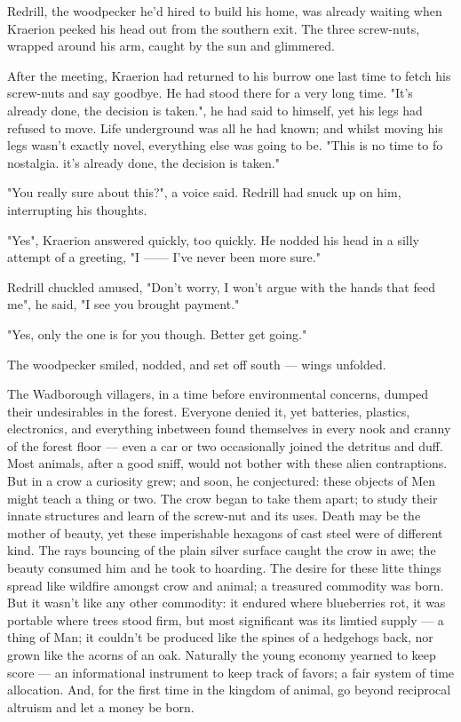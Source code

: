 \documentclass[smalldemyvopaper,11pt,twoside,onecolumn,openright,extrafontsizes]{memoir}
\begin{document}
Redrill, the woodpecker he'd hired to build his home, was already waiting when Kraerion peeked his head out from the southern exit. The three screw-nuts, wrapped around his arm, caught by the sun and glimmered.

After the meeting, Kraerion had returned to his burrow one last time to fetch his screw-nuts and say goodbye. He had stood there for a very long time. 
"It's already done, the decision is taken.", he had said to himself, yet his legs had refused to move. Life underground was all he had known; and whilst moving his legs wasn't exactly novel, everything else was going to be. "This is no time to fo nostalgia. it's already done, the decision is taken."

"You really sure about this?", a voice said. Redrill had snuck up on him, interrupting his thoughts.

"Yes", Kraerion answered quickly, too quickly. He nodded his head in a silly attempt of a greeting, "I —— I've never been more sure."

Redrill chuckled amused, "Don't worry, I won't argue with the hands that feed me", he said, "I see you brought payment."

"Yes, only the one is for you though. Better get going."

The woodpecker smiled, nodded, and set off south — wings unfolded.

The Wadborough villagers, in a time before environmental concerns, dumped their undesirables in the forest. Everyone denied it, yet batteries, plastics, electronics, and everything inbetween found themselves in every nook and cranny of the forest floor — even a car or two occasionally joined the detritus and duff. Most animals, after a good sniff, would not bother with these alien contraptions. But in a crow a curiosity grew; and soon, he conjectured: these objects of Men might teach a thing or two. The crow began to take them apart; to study their innate structures and learn of the screw-nut and its uses. Death may be the mother of beauty, yet these imperishable hexagons of cast steel were of different kind. The rays bouncing of the plain silver surface caught the crow in awe; the beauty consumed him and he took to hoarding. The desire for these litte things spread like wildfire amongst crow and animal; a treasured commodity was born. But it wasn't like any other commodity: it endured where blueberries rot, it was portable where trees stood firm, but most significant was its limtied supply — a thing of Man; it couldn't be produced like the spines of a hedgehogs back, nor grown like the acorns of an oak. Naturally the young economy yearned to keep score — an informational instrument to keep track of favors; a fair system of time allocation. And, for the first time in the kingdom of animal, go beyond reciprocal altruism and let a money be born.
\end{document}
